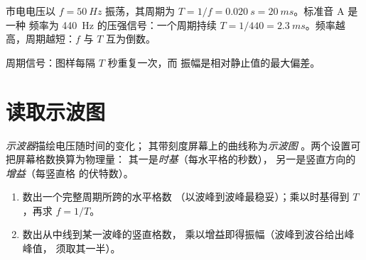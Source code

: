 \begin{example}[市电与音乐会标准音]\label{ex:g10:signals-and-waves:mains}
市电电压以 $f = \qty{50}{Hz}$ 振荡，其周期为
$T = 1/f = \qty{0.020}{s} = \qty{20}{ms}$。标准音 A 是一种
频率为 \qty{440}{Hz} 的压强信号：一个周期持续
$T = 1/440 = \qty{2.3}{ms}$。频率越高，周期越短：$f$ 与 $T$
互为倒数。
\end{example}

\begin{omfigure}

{\small 周期信号：图样每隔 $T$ 秒重复一次，而
振幅是相对静止值的最大偏差。}
\end{omfigure}

\section{读取示波图}

\begin{definition}[示波器]\label{def:g10:signals-and-waves:oscilloscope}
\emph{示波器}描绘电压随时间的变化；
其带刻度屏幕上的曲线称为\emph{示波图}%
。两个设置可把屏幕格数换算为物理量：
其一是\emph{时基}（每水平格的秒数），
另一是竖直方向的\emph{增益}（每竖直格
的伏特数）。
\end{definition}

\begin{method}[从屏幕读数到数值]\label{met:g10:signals-and-waves:oscillogram}
\begin{enumerate}
  \item 数出一个完整周期所跨的水平格数
        （以波峰到波峰最稳妥）；乘以时基得到
        $T$，再求 $f = 1/T$。
  \item 数出从中线到某一波峰的竖直格数，
        乘以增益即得振幅（波峰到波谷给出峰峰值，
        须取其一半）。
\end{enumerate}
\end{method}

